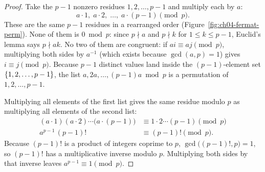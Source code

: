 \begin{proof}
Take the $p - 1$ nonzero residues $1, 2, \dots, p-1$ and multiply each by $a$:
\[
  a \cdot 1,\; a \cdot 2,\; \dots,\; a \cdot (p-1) \pmod p.
\]
These are the same $p - 1$ residues in a rearranged order (Figure~\ref{fig:ch04-fermat-perm}). None
of them is $0 \bmod p$: since $p \nmid a$ and $p \nmid k$ for $1 \le k \le p-1$, Euclid's lemma says
$p \nmid ak$. No two of them are congruent: if $ai \equiv aj \pmod p$, multiplying both sides by
$a^{-1}$ (which exists because $\gcd(a,p) = 1$) gives $i \equiv j \pmod p$. Because $p - 1$ distinct
values land inside the $(p-1)$-element set $\{1, 2, \dots, p-1\}$, the list
$a, 2a, \dots, (p-1)a \bmod p$ is a permutation of $1, 2, \dots, p-1$.

Multiplying all elements of the first list gives the same residue modulo $p$ as multiplying all
elements of the second list:
\begin{align*}
  (a \cdot 1)(a \cdot 2)\cdots\bigl(a \cdot (p-1)\bigr) &\equiv 1 \cdot 2 \cdots (p-1) \pmod p \\
  a^{p-1}\,(p-1)! &\equiv (p-1)! \pmod p.
\end{align*}
Because $(p-1)!$ is a product of integers coprime to $p$, $\gcd\bigl((p-1)!, p\bigr) = 1$, so
$(p-1)!$ has a multiplicative inverse modulo $p$. Multiplying both sides by that inverse leaves
$a^{p-1} \equiv 1 \pmod p$.
\end{proof}

